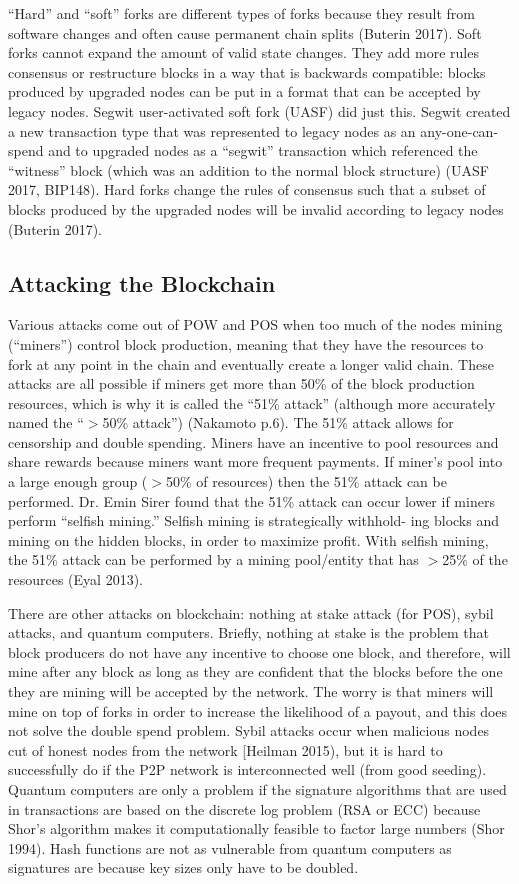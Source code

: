 \documentclass[letterpaper, 10 pt, conference]{ieeeconf}  %
\begin{document}
“Hard” and “soft” forks are different types of forks because they result from software changes and often cause permanent chain splits (Buterin 2017). Soft forks cannot expand the amount of valid state changes. They add more rules consensus or restructure blocks in a way that is backwards compatible: blocks produced by upgraded nodes can be put in a format that can be accepted by legacy nodes. Segwit user-activated soft fork (UASF) did just this. Segwit created a new transaction type that was represented to legacy nodes as an any-one-can-spend and to upgraded nodes as a “segwit” transaction which referenced the “witness” block (which was an addition to the normal block structure) (UASF 2017, BIP148). Hard forks change the rules of consensus such that a subset of blocks produced by the upgraded nodes will be invalid according to legacy nodes (Buterin 2017). 

\subsection{Attacking the Blockchain}
Various attacks come out of POW and POS when too much of the nodes mining (“miners”) control block production, meaning that they have the resources to fork at any point in the chain and eventually create a longer valid chain. These attacks are all possible if miners get more than 50\% of the block production resources, which is why it is called the “51\% attack” (although more accurately named the “$>$50\% attack”) (Nakamoto p.6). The 51\% attack allows for censorship and double spending. Miners have an incentive to pool resources and share rewards because miners want more frequent payments. If miner’s pool into a large enough group ($>$50\% of resources) then the 51\% attack can be performed. Dr. Emin Sirer found that the 51\% attack can occur lower if miners perform “selfish mining.” Selfish mining is strategically withhold- ing blocks and mining on the hidden blocks, in order to maximize profit. With selfish mining, the 51\% attack can be performed by a mining pool/entity that has $>$25\% of the resources (Eyal 2013).

There are other attacks on blockchain: nothing at stake attack (for POS), sybil attacks, and quantum computers. Briefly, nothing at stake is the problem that block producers do not have any incentive to choose one block, and therefore, will mine after any block as long as they are confident that the blocks before the one they are mining will be accepted by the network. The worry is that miners will mine on top of forks in order to increase the likelihood of a payout, and this does not solve the double spend problem. Sybil attacks occur when malicious nodes cut of honest nodes from the network [Heilman 2015), but it is hard to successfully do if the P2P network is interconnected well (from good seeding). Quantum computers are only a problem if the signature algorithms that are used in transactions are based on the discrete log problem (RSA or ECC) because Shor’s algorithm makes it computationally feasible to factor large numbers (Shor 1994). Hash functions are not as vulnerable from quantum computers as signatures are because key sizes only have to be doubled. 
\end{document}
